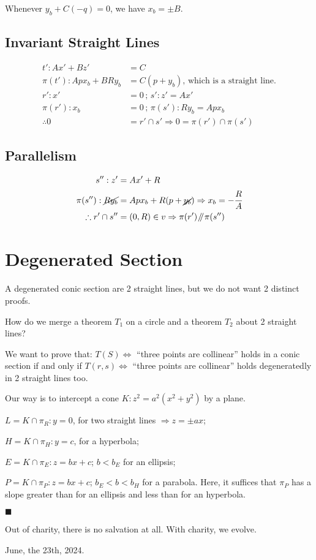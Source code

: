\documentclass[12pt]{article}
\numberwithin{table}{section}
\newcommand{\isParallel}{\mathbin{\!/\mkern-5mu/\!}}
\begin{document}
Whenever $y_b + C(-q) = 0$, we have $x_b = \pm B$.

\subsection{Invariant Straight Lines}

\begin{align}
t': Ax' + Bz' &= C \\
\pi(t'): A px_b + B R y_b &= C(p + y_b)\text{, which is a straight line.} \\
r': x' &= 0\,;\,s': z' = Ax' \\
\pi(r'): x_b &= 0\,;\,\pi(s'): Ry_b = Ap x_b\\ 
\therefore 0 &= r' \cap s' \Rightarrow 0 = \pi(r') \cap \pi(s')
\end{align}

\subsection{Parallelism}

\begin{align}
s'': z' &= Ax' + R \\
\pi(s''): \cancel{Ry_b} &= Ap x_b + R(p + \cancel{y_b}) \Rightarrow x_b = - \cfrac{R}{A} \\
\therefore r' \cap s'' &= (0,R) \in v \Rightarrow \pi(r') \isParallel \pi(s'')
\end{align}

\section{Degenerated Section}

A degenerated conic section are 2 straight lines, but we do not want 2 distinct proofs. 

How do we merge a theorem $T_1$ on a circle and a theorem $T_2$ about 2 straight lines?

We want to prove that: $T(S)\Leftrightarrow$ ``three points are collinear'' holds in a conic section if and only if $T(r,s)\Leftrightarrow$ ``three points are collinear'' holds degeneratedly in 2 straight lines too.

Our way is to intercept a cone $K:z^2 = a^2(x^2 + y^2)$ by a plane.

$L = K\cap \pi_R: y = 0$, for two straight lines $\Rightarrow z = \pm ax$;

$H = K\cap \pi_H: y = c$, for a hyperbola;

$E = K\cap \pi_E: z = bx + c$; $b < b_E$ for an ellipsis;

$P = K\cap \pi_P: z = bx + c$; $b_E < b < b_H$ for a parabola. Here, it suffices that $\pi_P$ has a slope greater than for an ellipsis and less than for an hyperbola.

$\blacksquare$

\vspace{12mm}

Out of charity, there is no salvation at all. With charity, we evolve.

June, the 23th, 2024.

%
\end{document}
